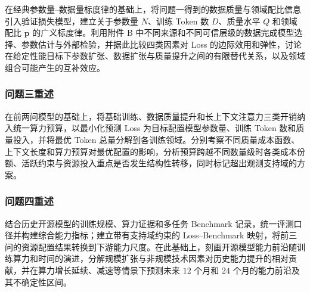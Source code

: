 在经典参数量--数据量标度律的基础上，将问题一得到的数据质量与领域配比信息引入验证损失模型，建立关于参数量 $N$、训练 Token 数 $D$、质量水平 $Q$ 和领域配比 $\boldsymbol p$ 的广义标度律。利用附件 B 中不同来源和不同可信层级的数据完成模型选择、参数估计与外部检验，并据此比较四类因素对 Loss 的边际效用和弹性，讨论在给定性能目标下参数扩张、数据扩张与质量提升之间的有限替代关系，以及领域组合可能产生的互补效应。

\subsubsection{问题三重述}

在前两问模型的基础上，将基础训练、数据质量提升和长上下文注意力三类开销纳入统一算力预算，以最小化预测 Loss 为目标配置模型参数量、训练 Token 数和质量投入，并将最优 Token 总量分解到各训练领域。分别考察不同质量成本函数、上下文长度和算力预算对最优配置的影响，分析预算跨越不同数量级时各类成本份额、活跃约束与资源投入重点是否发生结构性转移，同时标记超出观测支持域的方案。

\subsubsection{问题四重述}

结合历史开源模型的训练规模、算力证据和多任务 Benchmark 记录，统一评测口径并构建综合能力指标；建立带有支持域约束的 Loss--Benchmark 映射，将前三问的资源配置结果转换到下游能力尺度。在此基础上，刻画开源模型能力前沿随训练算力和时间的演进，分解规模扩张与非规模技术因素对历史能力提升的相对贡献，并在算力增长延续、减速等情景下预测未来 $12$ 个月和 $24$ 个月的能力前沿及其不确定性区间。

 
